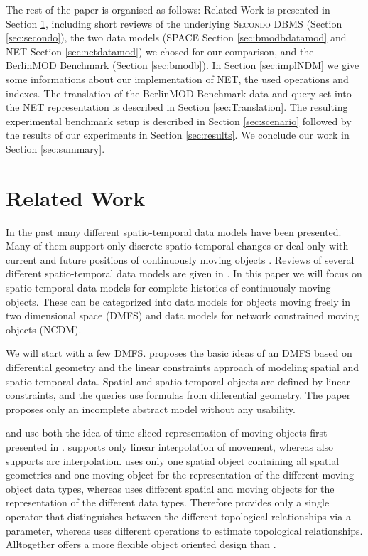 \documentclass[a4paper]{article}
\newcommand{\secondo}{\textsc{Secondo}}
\newcommand{\bmodb} {BerlinMOD Benchmark}
\begin{document}
The rest of the paper is organised as follows: Related Work is presented in Section
\ref{sec:relWork}, including short reviews of the underlying \secondo{} DBMS
(Section \ref{sec:secondo}), the two data models (SPACE Section \ref{sec:bmodbdatamod}
and NET Section \ref{sec:netdatamod}) we chosed for our comparison, and the
\bmodb{} (Section \ref{sec:bmodb}).
In Section \ref{sec:implNDM} we give some informations about our implementation
of NET, the used operations and indexes.
The translation of the \bmodb{} data and query set into the NET representation
is described in Section \ref{sec:Translation}. The resulting experimental benchmark
setup is described in Section \ref{sec:scenario} followed by the results of our
experiments in Section \ref{sec:results}. We conclude our work in Section \ref{sec:summary}.
\section{Related Work}
\label{sec:relWork}
In the past many different spatio-temporal data models have been presented. Many
of them support only discrete spatio-temporal changes
\cite{sqlstchen,HunterWilliamson,Langran2,Langran1,Ramadrachan}
or deal only with current and future positions of continuously moving objects
\cite{MOSTWolfson}. Reviews of several different spatio-temporal data models are
given in \cite{ReviewSTDMPelekis}. In this paper we will focus on spatio-temporal
data models for complete histories of continuously moving objects. These can be
categorized into data models for objects moving freely in two dimensional space
(DMFS) and data models for network constrained moving objects (NCDM).

We will start with a few DMFS. \cite{MOLRaQSu} proposes the basic ideas of an
DMFS based on differential geometry and the linear constraints approach of modeling
spatial and spatio-temporal data. Spatial and spatio-temporal objects
are defined by linear constraints, and the queries use formulas from differential
geometry. The paper proposes only an incomplete abstract model without any usability.

\cite{STAUPelekis} and \cite{RepresentingMovingObjectsGueting,DataModelDataStructureGueting}
use both the idea of time sliced representation of moving objects first presented
in \cite{RepresentingMovingObjectsGueting}. \cite{DataModelDataStructureGueting}
supports only linear interpolation of movement, whereas \cite{STAUPelekis} also
supports arc interpolation. \cite{STAUPelekis} uses only one spatial
object containing all spatial geometries and one moving object for the
representation of the different moving object data types, whereas
\cite{RepresentingMovingObjectsGueting,DataModelDataStructureGueting} uses different
spatial and moving objects for the representation of the different
data types. Therefore \cite{STAUPelekis} provides only a single operator that
distinguishes between the different topological relationships via a parameter,
whereas \cite{RepresentingMovingObjectsGueting,DataModelDataStructureGueting}
uses different operations to estimate topological relationships. Alltogether
\cite{STAUPelekis} offers a more flexible object oriented design than
\cite{RepresentingMovingObjectsGueting,DataModelDataStructureGueting}.
\end{document}
